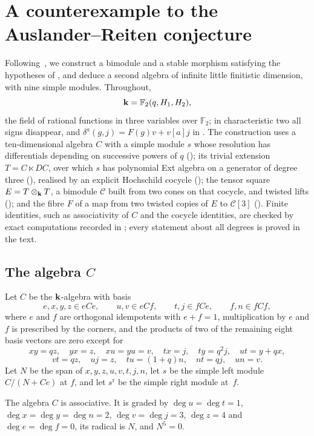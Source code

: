 \section{A counterexample to the Auslander--Reiten conjecture}
\label{sec:ar-route}

Following~\cite{OAI26ar}, we construct a bimodule and a stable morphism
satisfying the hypotheses of , and deduce a second algebra
of infinite little finitistic dimension, with nine simple modules. Throughout,
\[
  \mathbf{k}=\mathbb{F}_2(q,H_1,H_2),
\]
the field of rational functions in three variables over $\mathbb{F}_2$; in
characteristic two all signs disappear, and ${\delta^a(g,j)=F(g)v+v[a]j}$ in
. The construction uses a ten-dimensional algebra $C$ with
a simple module $s$ whose resolution has differentials depending on successive
powers of $q$ (); its trivial extension ${T=C\ltimes DC}$,
over which $s$ has polynomial Ext algebra on a generator of degree three
(), realised by an explicit Hochschild cocycle
(); the tensor square ${E=T\otimes_{\mathbf{k}} T}$, a bimodule
$\mathcal{C}$ built from two cones on that cocycle, and twisted lifts
(); and the fibre $F$
of a map from two twisted copies of $E$ to $\mathcal{C}[3]$
(). Finite identities, such as associativity of $C$ and
the cocycle identities, are checked by exact computations recorded in
; every statement about all degrees is proved in the
text.

\subsection{The algebra \texorpdfstring{$C$}{C}}
\label{subsec:algebra-C}

Let $C$ be the $\mathbf{k}$-algebra with basis
\[
  e,x,y,z\in eCe,\qquad u,v\in eCf,\qquad t,j\in fCe,\qquad f,n\in fCf,
\]
where $e$ and $f$ are orthogonal idempotents with ${e+f=1}$, multiplication by
$e$ and $f$ is prescribed by the corners, and the products of two of the
remaining eight basis vectors are zero except for
\[
  xy=qz,\quad yx=z,\quad xu=yu=v,\quad tx=j,\quad ty=q^2j,\quad ut=y+qx,
\]
\[
  vt=qz,\quad uj=z,\quad tu=(1+q)n,\quad nt=qj,\quad un=v.
\]
Let $N$ be the span of $x,y,z,u,v,t,j,n$, let $s$ be the simple left module
${C/(N+Ce)}$ at $f$, and let $s^{\mathrm{r}}$ be the simple right module at~$f$.

\begin{lemma}
  \label{lemma:algebra-C}
  The algebra $C$ is associative. It is graded by
  ${\deg u=\deg t=1}$, ${\deg x=\deg y=\deg n=2}$, ${\deg v=\deg j=3}$, ${\deg z=4}$
  and ${\deg e=\deg f=0}$, its radical is $N$, and ${N^5=0}$.
\end{lemma}

